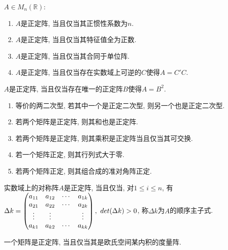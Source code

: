 \begin{inference}
    $A\in M_n(\mathbb{R})$:
    \begin{enumerate}[itemindent=1em]
        \item $A$是正定阵, 当且仅当其正惯性系数为$n$.
        \item $A$是正定阵, 当且仅当其特征值全为正数.
        \item $A$是正定阵, 当且仅当其合同于单位阵.
        \item $A$是正定阵, 当且仅当存在实数域上可逆的$C$使得$A=C'C$.
    \end{enumerate}
\end{inference}

\begin{example}
    $A$是正定阵, 当且仅当存在唯一的正定阵$B$使得$A=B^2$.
\end{example}

\begin{property}
    \par
    \begin{enumerate}[itemindent=1em]
        \item 等价的两二次型, 若其中一个是正定二次型, 则另一个也是正定二次型.
        \item 若两个矩阵是正定阵, 则其和也是正定阵.
        \item 若两个矩阵是正定阵, 则其乘积是正定阵当且仅当其可交换.
        \item 若一个矩阵正定, 则其行列式大于零.
        \item 若两个矩阵正定, 则其组合成的准对角阵正定.
    \end{enumerate}
\end{property}

\begin{theorem}[正定阵的充要条件]
    实数域上的对称阵$A$是正定阵, 当且仅当, 对$1\le i \le n$, 有$\Delta k=\begin{pmatrix} {a}_{11} & {a}_{12} & \cdots & {a}_{1{k}}\\ {a}_{21} & {a}_{22} & \cdots & {a}_{2{k}}\\ \vdots & \vdots & & \vdots \\ {a}_{{k}1}&{a}_{{k}2}&\cdots & {a}_{{k}{k}} \end{pmatrix},\ det(\Delta k)>0$, 称$\Delta k$为$A$的顺序主子式.
\end{theorem}

\begin{theorem}[正定阵的充要条件]
    一个矩阵是正定阵, 当且仅当其是欧氏空间某内积的度量阵.
\end{theorem}
